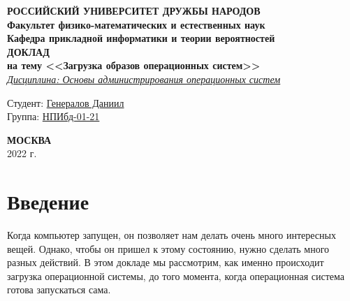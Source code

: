 \documentclass[a4page]{article}
\begin{document}
 
 
\begin{titlepage}

\begin{center}
\hfill \break
\textbf{
\large{РОССИЙСКИЙ УНИВЕРСИТЕТ ДРУЖБЫ НАРОДОВ}\\
\normalsize{Факультет физико-математических и естественных наук}\\ 
\normalsize{Кафедра прикладной информатики и теории вероятностей}\\
}
\vspace*{\fill}
\Large{\textbf{ДОКЛАД\\ на тему <<Загрузка образов операционных систем>>}}
\\
\underline{\textit{\normalsize{Дисциплина: Основы администрирования операционных систем}}}
\vspace*{\fill}

\end{center}
 
 \begin{flushright}
 Студент: \underline{Генералов Даниил}\\ \vspace{0.5cm}
 Группа: \underline{НПИбд-01-21}
 \end{flushright}
 
 
\begin{center} \textbf{МОСКВА} \\ 2022 г. \end{center}
\thispagestyle{empty} %
 
\end{titlepage}

\newpage

\tableofcontents

\newpage

\newcommand{\code}[1]{\texttt{#1}}

\section{Введение}

Когда компьютер запущен, он позволяет нам делать очень много интересных вещей.
Однако, чтобы он пришел к этому состоянию, нужно сделать много разных действий.
В этом докладе мы рассмотрим, как именно происходит загрузка операционной системы,
до того момента, когда операционная система готова запускаться сама.
\end{document}
